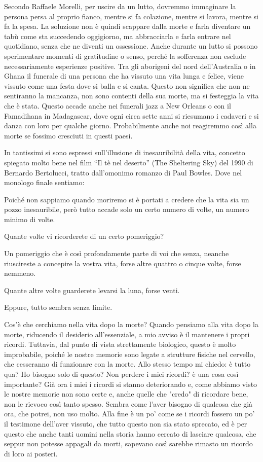 \documentclass[12pt]{book} %
\begin{document}
Secondo Raffaele Morelli, per uscire da un lutto, dovremmo immaginare la persona persa al proprio fianco, mentre si fa
colazione, mentre si lavora, mentre si fa la spesa. La soluzione non è quindi scappare dalla morte e farla diventare un
tabù come sta succedendo oggigiorno, ma abbracciarla e farla entrare nel quotidiano, senza che ne diventi un ossessione. Anche durante un lutto si possono sperimentare momenti di gratitudine o senso, perché la sofferenza non esclude necessariamente esperienze positive.
Tra gli aborigeni del nord dell'Australia o in Ghana il funerale di una persona che ha vissuto una vita lunga e felice, viene
vissuto come una festa dove si balla e si canta. Questo non significa che non ne sentiranno la mancanza, non sono
contenti della sua morte, ma si festeggia la vita che è stata. Questo accade anche nei funerali jazz a New Orleans o
con il Famadihana in Madagascar, dove ogni circa sette anni si riesumano i cadaveri e si danza con loro per qualche
giorno. Probabilmente anche noi reagiremmo così alla morte se fossimo cresciuti in questi paesi.

In tantissimi si sono espressi sull'illusione di inesauribilità della vita, concetto spiegato molto
bene nel film “Il tè nel deserto” (The Sheltering Sky) del 1990 di Bernardo Bertolucci, tratto dall'omonimo romanzo di
Paul Bowles. Dove nel monologo finale sentiamo:

Poiché non sappiamo quando moriremo si è portati a credere che la vita sia un pozzo inesauribile, però tutto accade solo
un certo numero di volte, un numero minimo di volte.

Quante volte vi ricorderete di un certo pomeriggio?

Un pomeriggio che è così profondamente parte di voi che senza, neanche riuscireste a concepire la vostra vita, forse
altre quattro o cinque volte, forse nemmeno.

Quante altre volte guarderete levarsi la luna, forse venti.

Eppure, tutto sembra senza limite.

Cos'è che cerchiamo nella vita dopo la morte? Quando pensiamo alla vita dopo la morte, riducendo il desiderio all'essenziale, a mio avviso è il mantenere i propri ricordi. Tuttavia, dal punto di vista strettamente biologico, questo è molto improbabile, poiché le nostre memorie sono legate a strutture fisiche nel cervello, che cesseranno di funzionare con la morte. Allo stesso tempo mi chiedo: è tutto qua? Ho bisogno solo di questo? Non perdere i miei ricordi? è una cosa così importante? Già ora i miei i ricordi si stanno deteriorando e, come abbiamo visto le nostre memorie non sono certe e, anche quelle che "credo" di ricordare bene, non le rievoco così tanto spesso. Sembra come l'aver bisogno di qualcosa che già  ora, che potrei, non uso molto. Alla fine è un po' come se i ricordi fossero un po' il testimone dell'aver vissuto, che tutto questo non sia stato sprecato, ed è per questo che anche tanti uomini nella storia hanno cercato di lasciare qualcosa, che seppur non potesse appagali da morti, sapevano così sarebbe rimasto un ricordo di loro ai posteri.
\end{document}

